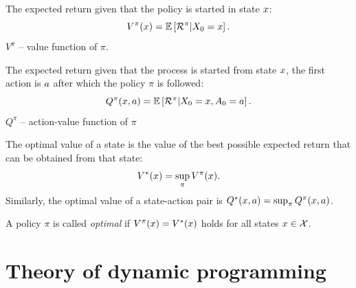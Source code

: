 {
\begin{Definition}
The expected return given that the policy is started in state $x$:
\[
V^\pi(x) = {\mathbb E}\left[ \mathcal{R}^\pi | X_0 = x \right].
\]
$V^\pi$ -- value function of $\pi$.
\end{Definition}
\begin{Definition}
The expected return given that the process is started from state $x$, the first action is $a$ after which the policy $\pi$ is followed:
\[
Q^\pi(x,a) = {\mathbb E}\left[ \mathcal{R}^\pi | X_0 = x,A_0 = a \right].
\]
$Q^\pi$ -- action-value function of $\pi$
\end{Definition}

}


{
\begin{Definition}
The \alert{optimal value} of a state is the value of the best possible expected return that can be obtained from that state:
\[
V^*(x) = \sup_{\pi} V^\pi(x).
\] 
Similarly, the \alert{ optimal value } of a state-action pair is $Q^*(x,a) = \sup_{\pi} Q^\pi(x,a)$.
\end{Definition}
\begin{Definition}
A policy $\pi$ is called {\em optimal} if $V^\pi(x) = V^*(x)$ holds for all states $x\in\mathcal{X}$.
\end{Definition}

}

\section{Theory of dynamic programming}
